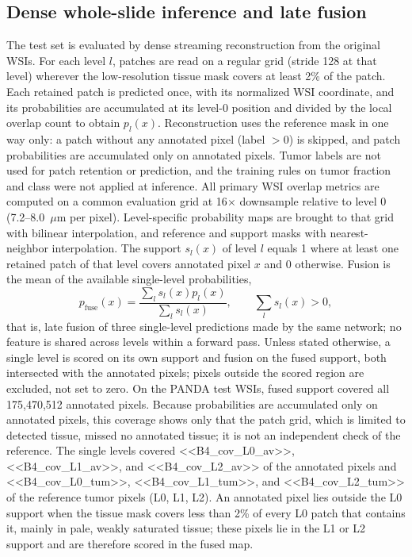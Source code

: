 \documentclass[10pt,letterpaper]{article}
\begin{document}
\subsection*{Dense whole-slide inference and late fusion}
The test set is evaluated by dense streaming reconstruction from the original WSIs. For each level $l$, patches are read on a regular grid (stride 128 at that level) wherever the low-resolution tissue mask covers at least 2\% of the patch. Each retained patch is predicted once, with its normalized WSI coordinate, and its probabilities are accumulated at its level-0 position and divided by the local overlap count to obtain $p_l(x)$. Reconstruction uses the reference mask in one way only: a patch without any annotated pixel (label $>0$) is skipped, and patch probabilities are accumulated only on annotated pixels. Tumor labels are not used for patch retention or prediction, and the training rules on tumor fraction and class were not applied at inference. All primary WSI overlap metrics are computed on a common evaluation grid at 16$\times$ downsample relative to level 0 (7.2--8.0~$\mu$m per pixel). Level-specific probability maps are brought to that grid with bilinear interpolation, and reference and support masks with nearest-neighbor interpolation. The support $s_l(x)$ of level $l$ equals 1 where at least one retained patch of that level covers annotated pixel $x$ and 0 otherwise. Fusion is the mean of the available single-level probabilities,
\begin{equation}
 p_{\mathrm{fuse}}(x)=\frac{\sum_l s_l(x)p_l(x)}{\sum_l s_l(x)}, \qquad \sum_l s_l(x)>0,
\end{equation}
that is, late fusion of three single-level predictions made by the same network; no feature is shared across levels within a forward pass. Unless stated otherwise, a single level is scored on its own support and fusion on the fused support, both intersected with the annotated pixels; pixels outside the scored region are excluded, not set to zero. On the PANDA test WSIs, fused support covered all 175,470,512 annotated pixels. Because probabilities are accumulated only on annotated pixels, this coverage shows only that the patch grid, which is limited to detected tissue, missed no annotated tissue; it is not an independent check of the reference. The single levels covered <<B4_cov_L0_av>>, <<B4_cov_L1_av>>, and <<B4_cov_L2_av>> of the annotated pixels and <<B4_cov_L0_tum>>, <<B4_cov_L1_tum>>, and <<B4_cov_L2_tum>> of the reference tumor pixels (L0, L1, L2). An annotated pixel lies outside the L0 support when the tissue mask covers less than 2\% of every L0 patch that contains it, mainly in pale, weakly saturated tissue; these pixels lie in the L1 or L2 support and are therefore scored in the fused map.
\end{document}
